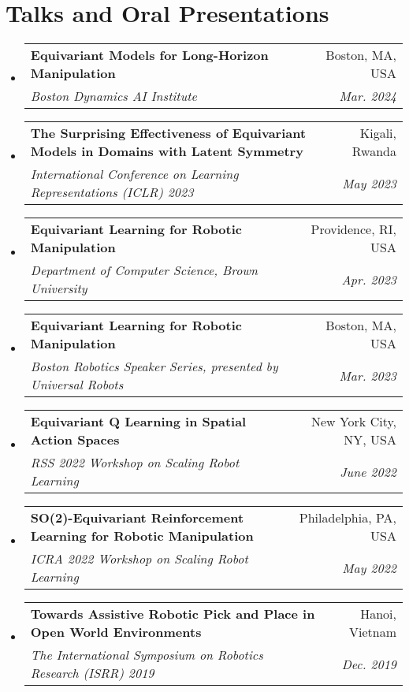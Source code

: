 \documentclass[letterpaper,11pt]{article}
\makeatletter
\newcommand{\resumeSubheading}[4]{
  \vspace{-4pt}\item
    \begin{tabular*}{0.97\textwidth}[t]{l@{\extracolsep{\fill}}r}
      \textbf{\small#1} & \small#2 \\
      \textit{\small#3} & \textit{\small #4} \\
    \end{tabular*}\vspace{-7pt}
}
\newcommand{\resumeSubHeadingListStart}{\begin{itemize}[leftmargin=0.15in, label={}]}
\newcommand{\resumeSubHeadingListEnd}{\end{itemize}}
\makeatother
\begin{document}
\section{Talks and Oral Presentations}
\resumeSubHeadingListStart
\resumeSubheading
{Equivariant Models for Long-Horizon Manipulation}{Boston, MA, USA}
{Boston Dynamics AI Institute}{Mar. 2024}
\resumeSubheading
{The Surprising Effectiveness of Equivariant Models in Domains with Latent Symmetry}{Kigali, Rwanda}
{International Conference on Learning Representations (ICLR) 2023}{May 2023}
\resumeSubheading
{Equivariant Learning for Robotic Manipulation}{Providence, RI, USA}
{Department of Computer Science, Brown University}{Apr. 2023}
\resumeSubheading
{Equivariant Learning for Robotic Manipulation}{Boston, MA, USA}
{Boston Robotics Speaker Series, presented by Universal Robots}{Mar. 2023}
\resumeSubheading{Equivariant Q Learning in Spatial Action Spaces}{New York City, NY, USA}{RSS 2022 Workshop on Scaling Robot Learning
}{June 2022}
\resumeSubheading{SO(2)-Equivariant Reinforcement Learning for Robotic Manipulation}{Philadelphia, PA, USA}{ICRA 2022 Workshop on Scaling Robot Learning}{May 2022}
\resumeSubheading{Towards Assistive Robotic Pick and Place in Open World Environments}{Hanoi, Vietnam}{The International Symposium on Robotics Research (ISRR) 2019}{Dec. 2019}
\vspace{1pt}
\resumeSubHeadingListEnd
\end{document}
